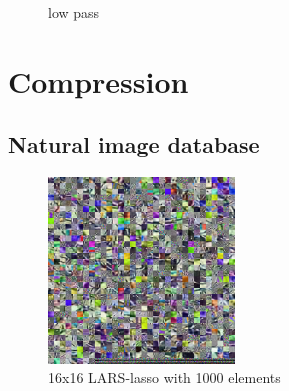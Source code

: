 \begin{figure}
\centering
{}
\hspace{5mm}
\caption{low pass}
\label{fig:16_1000_lasso}
\end{figure}

\section{Compression}

\subsection{Natural image database}


\begin{figure}[h]
\centering
\includegraphics[width = 0.44\textwidth]{images/16_1000_1000_10_lasso.png}
\caption{16x16 LARS-lasso with 1000 elements}
\label{fig:16_1000_lasso}
\end{figure}

